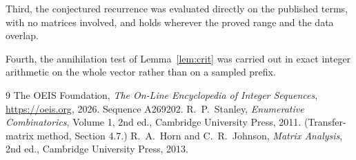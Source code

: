 \documentclass[11pt,a4paper]{article}
\theoremstyle{plain}
\theoremstyle{definition}
\begin{document}
Third, the conjectured recurrence was evaluated directly on the published terms, with no
matrices involved, and holds wherever the proved range and the data overlap.

Fourth, the annihilation test of Lemma~\ref{lem:crit} was carried out in exact integer
arithmetic on the whole vector rather than on a sampled prefix.

\begin{thebibliography}{9}
 The OEIS Foundation, \emph{The On-Line Encyclopedia of Integer
Sequences}, \url{https://oeis.org}, 2026. Sequence A269202.
 R.~P.~Stanley, \emph{Enumerative Combinatorics}, Volume 1, 2nd ed.,
Cambridge University Press, 2011. (Transfer-matrix method, Section 4.7.)
 R.~A.~Horn and C.~R.~Johnson, \emph{Matrix Analysis}, 2nd ed., Cambridge
University Press, 2013.
\end{thebibliography}
\end{document}
